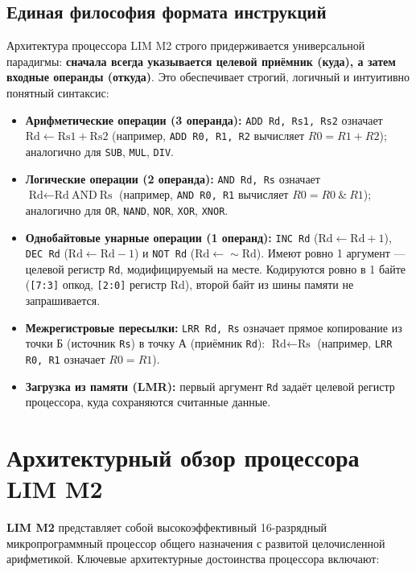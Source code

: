 \documentclass[11pt,a4paper]{article}
\newcommand{\reg}[1]{\texttt{#1}}
\begin{document}
\subsection{Единая философия формата инструкций}
Архитектура процессора LIM M2 строго придерживается универсальной парадигмы: \textbf{сначала всегда указывается целевой приёмник (куда), а затем входные операнды (откуда)}. Это обеспечивает строгий, логичный и интуитивно понятный синтаксис:
\begin{itemize}
  \item \textbf{Арифметические операции (3 операнда):} \texttt{ADD Rd, Rs1, Rs2} означает $\text{Rd} \leftarrow \text{Rs1} + \text{Rs2}$ (например, \texttt{ADD R0, R1, R2} вычисляет $R0 = R1 + R2$); аналогично для \texttt{SUB}, \texttt{MUL}, \texttt{DIV}.
  \item \textbf{Логические операции (2 операнда):} \texttt{AND Rd, Rs} означает $\text{Rd} \leftarrow \text{Rd} \ \text{AND}\ \text{Rs}$ (например, \texttt{AND R0, R1} вычисляет $R0 = R0 \ \& \ R1$); аналогично для \texttt{OR}, \texttt{NAND}, \texttt{NOR}, \texttt{XOR}, \texttt{XNOR}.
  \item \textbf{Однобайтовые унарные операции (1 операнд):} \texttt{INC Rd} ($\text{Rd} \leftarrow \text{Rd} + 1$), \texttt{DEC Rd} ($\text{Rd} \leftarrow \text{Rd} - 1$) и \texttt{NOT Rd} ($\text{Rd} \leftarrow \sim\text{Rd}$). Имеют ровно 1 аргумент --- целевой регистр \reg{Rd}, модифицируемый на месте. Кодируются ровно в 1 байте (\texttt{[7:3]} опкод, \texttt{[2:0]} регистр Rd), второй байт из шины памяти не запрашивается.
  \item \textbf{Межрегистровые пересылки:} \texttt{LRR Rd, Rs} означает прямое копирование из точки Б (источник \reg{Rs}) в точку А (приёмник \reg{Rd}): $\text{Rd} \leftarrow \text{Rs}$ (например, \texttt{LRR R0, R1} означает $R0 = R1$).
  \item \textbf{Загрузка из памяти (LMR):} первый аргумент \reg{Rd} задаёт целевой регистр процессора, куда сохраняются считанные данные.
\end{itemize}

\section{Архитектурный обзор процессора LIM M2}
\textbf{LIM M2} представляет собой высокоэффективный 16-разрядный микропрограммный процессор общего назначения с развитой целочисленной арифметикой. Ключевые архитектурные достоинства процессора включают:
\end{document}
